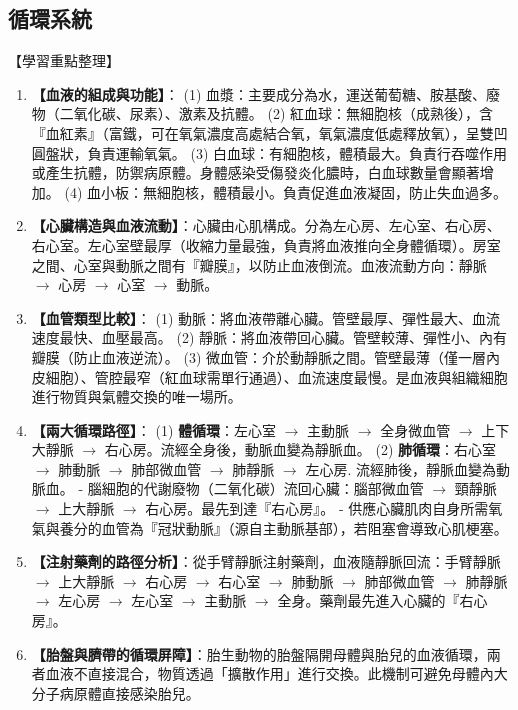 \documentclass[11pt,a4paper]{article}
\begin{document}
\subsection{循環系統}
\begin{learningpoints}{【學習重點整理】}
\begin{enumerate}[label=\arabic*.]
  \item \textbf{【血液的組成與功能】}：
  (1) 血漿：主要成分為水，運送葡萄糖、胺基酸、廢物（二氧化碳、尿素）、激素及抗體。
  (2) 紅血球：無細胞核（成熟後），含『血紅素』（富鐵，可在氧氣濃度高處結合氧，氧氣濃度低處釋放氧），呈雙凹圓盤狀，負責運輸氧氣。
  (3) 白血球：有細胞核，體積最大。負責行吞噬作用或產生抗體，防禦病原體。身體感染受傷發炎化膿時，白血球數量會顯著增加。
  (4) 血小板：無細胞核，體積最小。負責促進血液凝固，防止失血過多。
  \item \textbf{【心臟構造與血液流動】}：心臟由心肌構成。分為左心房、左心室、右心房、右心室。左心室壁最厚（收縮力量最強，負責將血液推向全身體循環）。房室之間、心室與動脈之間有『瓣膜』，以防止血液倒流。血液流動方向：靜脈 $\rightarrow$ 心房 $\rightarrow$ 心室 $\rightarrow$ 動脈。
  \item \textbf{【血管類型比較】}：
  (1) 動脈：將血液帶離心臟。管壁最厚、彈性最大、血流速度最快、血壓最高。
  (2) 靜脈：將血液帶回心臟。管壁較薄、彈性小、內有瓣膜（防止血液逆流）。
  (3) 微血管：介於動靜脈之間。管壁最薄（僅一層內皮細胞）、管腔最窄（紅血球需單行通過）、血流速度最慢。是血液與組織細胞進行物質與氣體交換的唯一場所。
  \item \textbf{【兩大循環路徑】}：
  (1) \textbf{體循環}：左心室 $\rightarrow$ 主動脈 $\rightarrow$ 全身微血管 $\rightarrow$ 上下大靜脈 $\rightarrow$ 右心房。流經全身後，動脈血變為靜脈血。
  (2) \textbf{肺循環}：右心室 $\rightarrow$ 肺動脈 $\rightarrow$ 肺部微血管 $\rightarrow$ 肺靜脈 $\rightarrow$ 左心房. 流經肺後，靜脈血變為動脈血。
  - 腦細胞的代謝廢物（二氧化碳）流回心臟：腦部微血管 $\rightarrow$ 頸靜脈 $\rightarrow$ 上大靜脈 $\rightarrow$ 右心房。最先到達『右心房』。
  - 供應心臟肌肉自身所需氧氣與養分的血管為『冠狀動脈』（源自主動脈基部），若阻塞會導致心肌梗塞。
  \item \textbf{【注射藥劑的路徑分析】}：從手臂靜脈注射藥劑，血液隨靜脈回流：手臂靜脈 $\rightarrow$ 上大靜脈 $\rightarrow$ 右心房 $\rightarrow$ 右心室 $\rightarrow$ 肺動脈 $\rightarrow$ 肺部微血管 $\rightarrow$ 肺靜脈 $\rightarrow$ 左心房 $\rightarrow$ 左心室 $\rightarrow$ 主動脈 $\rightarrow$ 全身。藥劑最先進入心臟的『右心房』。
  \item \textbf{【胎盤與臍帶的循環屏障】}：胎生動物的胎盤隔開母體與胎兒的血液循環，兩者血液不直接混合，物質透過「擴散作用」進行交換。此機制可避免母體內大分子病原體直接感染胎兒。

\end{enumerate}
\end{learningpoints}
\end{document}

